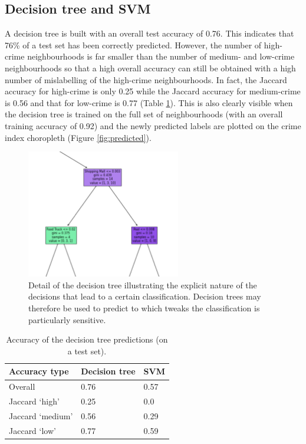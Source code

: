 \documentclass{article}
\begin{document}
\subsection{Decision tree and SVM}
A decision tree is built with an overall test accuracy of 0.76. This indicates that 76\% of a test set has been correctly predicted. However, the number of high-crime neighbourhoods is far smaller than the number of medium- and low-crime neighbourhoods so that a high overall accuracy can still be obtained with a high number of mislabelling of the high-crime neighbourhoods. In fact, the Jaccard accuracy for high-crime is only 0.25 while the Jaccard accuracy for medium-crime is 0.56 and that for low-crime is 0.77 (Table \ref{tab:accuracy}). This is also clearly visible when the decision tree is trained on the full set of neighbourhoods (with an overall training accuracy of 0.92) and the newly predicted labels are plotted on the crime index choropleth (Figure \ref{fig:predicted}).
\begin{figure}[ht]
\centering
    \includegraphics[width=0.6\textwidth]{pics/detail.png}
    \caption{Detail of the decision tree illustrating the explicit nature of the decisions that lead to a certain classification. Decision trees may therefore be used to predict to which tweaks the classification is particularly sensitive.}\label{fig:tree}
\end{figure}
\begin{table}
\centering
\begin{tabular}{lll}
 \hline\hline
 Accuracy type & Decision tree & SVM\\
 \hline
 Overall & 0.76 & 0.57\\
 Jaccard `high' & 0.25 & 0.0\\
 Jaccard `medium' & 0.56 & 0.29\\
 Jaccard `low' & 0.77 & 0.59\\
 \hline
\end{tabular}\caption{Accuracy of the decision tree predictions (on a test set).}\label{tab:accuracy}
\end{table}
\end{document}
